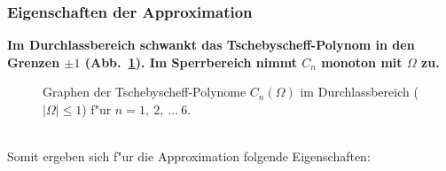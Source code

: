 \subsubsection{Eigenschaften der Approximation}
{\bf{\boldmath Im Durchlassbereich schwankt
    das Tschebyscheff-Polynom in den Grenzen $\pm 1$
    (Abb.~\ref{g-c-poly}). Im Sperrbereich nimmt $C_n$ monoton mit
    $\Omega$ zu.}}
\begin{figure}[!htb] %
\vspace*{-3mm}
\begin{center}%
  \caption{Graphen der
    Tschebyscheff-Polynome $C_{n}(\Omega)$ im
    Durchlassbereich ($|\Omega |\leq 1$)  f"ur $n=1, ~2,~\ldots~6$.\label{g-c-poly}}
\end{center}
\vspace*{-6mm} 
\end{figure}~\\
\nit Somit ergeben sich f"ur die Approximation folgende Eigenschaften:
